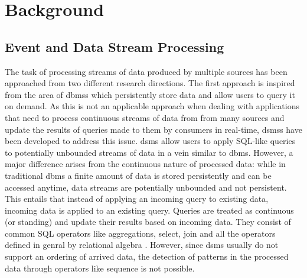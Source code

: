 \chapter{Background}


\section{Event and Data Stream Processing}


The task of processing streams of data produced by multiple sources has been approached from two different research directions. The first approach is inspired from the area of \glspl{dbms} which persistently store data and allow users to query it on demand. As this is not an applicable approach when dealing with applications that need to process continuous streams of data from from many sources and update the results of queries made to them by consumers in real-time, \glspl{dsms} have been developed to address this issue. \gls{dsms} allow users to apply SQL-like queries to potentially unbounded streams of data in a vein similar to \gls{dbms}. However, a major difference arises from the continuous nature of processed data: while in traditional \gls{dbms} a finite amount of data is stored persistently and can be accessed anytime, data streams are potentially unbounded and not persistent. This entails that instead of applying an incoming query to existing data, incoming data is applied to an existing query. Queries are treated as continuous (or standing) and update their results based on incoming data. They consist of common SQL operators like aggregations, select, join and all the operators defined in genral by relational algebra \cite{Cugola2012}. However, since \gls{dsms} usually do not support an ordering of arrived data, the detection of patterns in the processed data through operators like sequence is not possible.


